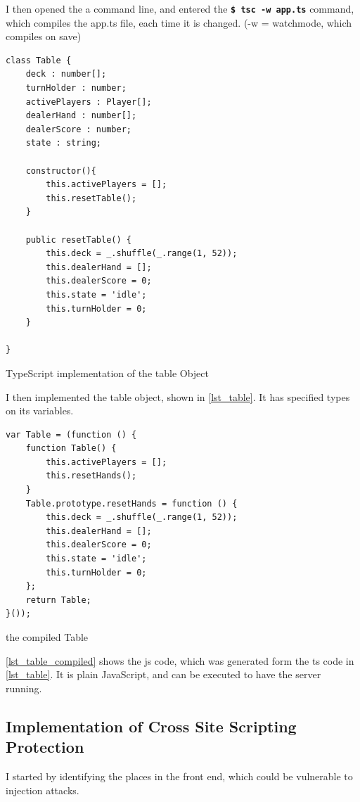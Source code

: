 \documentclass[a4paper]{article}
\begin{document}
I then opened the a command line, and entered the \textbf{\texttt{\$ tsc -w app.ts}} command, which compiles the app.ts file, each time it is changed. (-w = watchmode, which compiles on save)

\begin{listing}[H]
\begin{verbatim}
class Table {
    deck : number[];
    turnHolder : number;
    activePlayers : Player[];
    dealerHand : number[];
    dealerScore : number;
    state : string;

    constructor(){
        this.activePlayers = [];
        this.resetTable();
    }

    public resetTable() {
        this.deck = _.shuffle(_.range(1, 52));
        this.dealerHand = [];
        this.dealerScore = 0;
        this.state = 'idle';
        this.turnHolder = 0;
    }
    
}
\end{verbatim}
\caption{TypeScript implementation of the table Object}
\label{lst_table}
\end{listing}

I then implemented the table object, shown in \autoref{lst_table}. It has specified types on its variables.

\begin{listing}[H]
\begin{verbatim}
var Table = (function () {
    function Table() {
        this.activePlayers = [];
        this.resetHands();
    }
    Table.prototype.resetHands = function () {
        this.deck = _.shuffle(_.range(1, 52));
        this.dealerHand = [];
        this.dealerScore = 0;
        this.state = 'idle';
        this.turnHolder = 0;
    };
    return Table;
}());
\end{verbatim}
\caption{the compiled Table}
\label{lst_table_compiled}
\end{listing}


\autoref{lst_table_compiled} shows the js code, which was generated form the ts code in \autoref{lst_table}. It is plain JavaScript, and can be executed to have the server running.


\subsection{Implementation of Cross Site Scripting Protection}
I started by identifying the places in the front end, which could be vulnerable to injection attacks.
\end{document}
